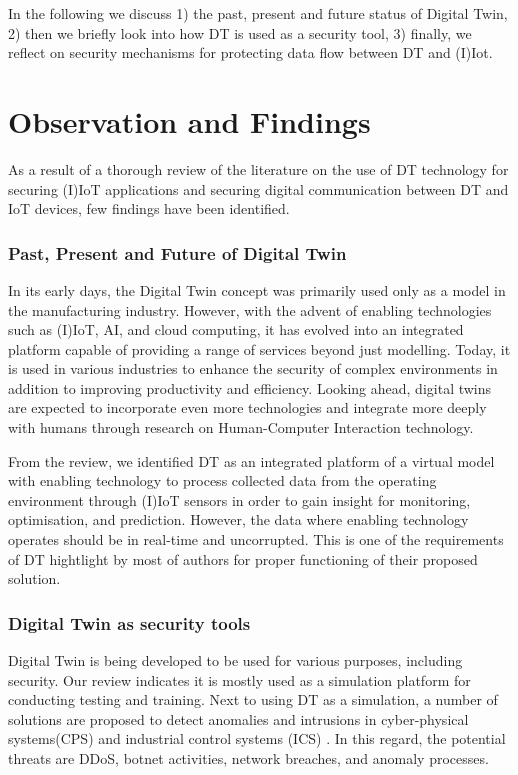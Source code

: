 In the following we discuss 1) the past, present and future status of Digital Twin, 2) then 
we briefly look into how DT is used as a security tool, 3) finally, we reflect on security mechanisms for protecting data flow between DT and (I)Iot.

\section{Observation and Findings}
As a result of a thorough review of the literature on the use of DT technology for securing (I)IoT applications and securing digital communication between DT and IoT devices, few findings have been identified.


\subsubsection{Past, Present and Future of Digital Twin}
In its early days, the Digital Twin concept was primarily used only as a model in the manufacturing industry. However, with the advent of enabling technologies such as (I)IoT, AI, and cloud computing, it has evolved into an integrated platform capable of providing a range of services beyond just modelling. Today, it is used in various industries to enhance the security of complex environments in addition to improving productivity and efficiency. Looking ahead, digital twins are expected to incorporate even more technologies and integrate more deeply with humans through research on Human-Computer Interaction technology.

From the review, we identified DT as an integrated platform of a virtual model with enabling technology to process collected data from the operating environment through (I)IoT sensors in order to gain insight for monitoring, optimisation, and prediction. However, the data where enabling technology operates should be in real-time and uncorrupted. This is one of the requirements of DT hightlight by most of authors for proper functioning of their proposed solution. 



\subsubsection{Digital Twin as security tools}
Digital Twin is being developed to be used for various purposes, including security. Our review indicates it is mostly used as a simulation platform for conducting testing and training. Next to using DT as a simulation, a number of solutions are proposed to detect anomalies \cite{sugumarAssessmentMethodDetecting2019, chukkapalliCyberPhysicalSystemSecurity2021} and intrusions in cyber-physical systems(CPS) and industrial control systems (ICS) \cite{vargheseDigitalTwinbasedIntrusion2022, akbarianIntrusionDetectionDigital2020}. In this regard, the potential threats are DDoS, botnet activities, network breaches, and anomaly processes.   


